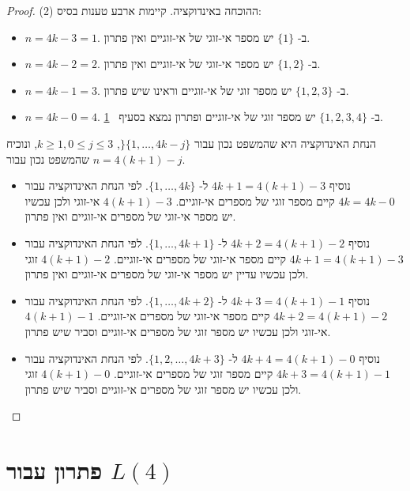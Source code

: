 \begin{proof}(2)
ההוכחה באינדוקציה. קיימות ארבע טענות בסיס:
\begin{itemize}
\item $n=4k-3=1$.
ב-%
$\{1\}$
יש מספר אי-זוגי של אי-זוגיים ואין פתרון.
\item $n=4k-2=2$.
ב-%
$\{1,2\}$
יש מספר אי-זוגי של אי-זוגיים ואין פתרון.
\item $n=4k-1=3$.
ב-%
$\{1,2,3\}$
יש מספר זוגי של אי-זוגיים וראינו שיש פתרון.
\item $n=4k-0=4$.
ב-%
$\{1,2,3,4\}$
יש מספר זוגי של אי-זוגיים ופתרון נמצא בסעיף%
~\ref{s.langford-four}.
\end{itemize}
הנחת האינדוקציה היא שהמשפט נכון עבור 
$\}\{1,\ldots,4k-j\}$,
$k\geq 1, 0\leq j\leq 3$,
ונוכיח שהמשפט נכון עבור
$n=4(k+1)-j$.
\begin{itemize}
\item
נוסיף
$4k+1=4(k+1)-3$
ל-%
$\{1,\ldots,4k\}$. 
לפי הנחת האינדוקציה עבור
$4k=4k-0$ 
קיים מספר זוגי של מספרים אי-זוגיים.
$4(k+1)-3$
אי-זוגי ולכן עכשיו יש מספר אי-זוגי של מספרים אי-זוגיים ואין פתרון.
\item 
נוסיף
$4k+2=4(k+1)-2$
ל-%
$\{1,\ldots,4k+1\}$.
לפי הנחת האינדוקציה עבור
$4k+1=4(k+1)-3$
קיים מספר אי-זוגי של מספרים אי-זוגיים.
$4(k+1)-2$
זוגי ולכן עכשיו עדיין יש מספר אי-זוגי של מספרים אי-זוגיים ואין פתרון.
\item 
נוסיף
$4k+3=4(k+1)-1$
ל-%
$\{1,\ldots,4k+2\}$.
לפי הנחת האינדוקציה עבור
$4k+2=4(k+1)-2$
קיים מספר אי-זוגי של מספרים אי-זוגיים.
$4(k+1)-1$
אי-זוגי ולכן עכשיו יש מספר זוגי של מספרים אי-זוגיים וסביר שיש פתרון.
\item 
נוסיף
$4k+4=4(k+1)-0$
ל-%
$\{1,2,\ldots,4k+3\}$.
לפי הנחת האינדוקציה עבור
$4k+3=4(k+1)-1$
קיים מספר זוגי של מספרים אי-זוגיים.
$4(k+1)-0$
זוגי ולכן עכשיו יש מספר זוגי של מספרים אי-זוגיים וסביר שיש פתרון.
\end{itemize}
\end{proof}


\newpage

\section{פתרון עבור
$L(4)$}\label{s.langford-four}

